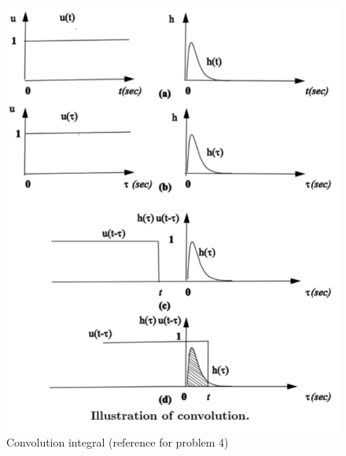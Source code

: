 \documentclass[]{article}
\begin{document}
\begin{figure}[h]
    \includegraphics[scale=0.53,center]{AERO_422_HW2_image.PNG}
    \caption{Convolution integral (reference for problem 4)}
\end{figure}
\end{document}
